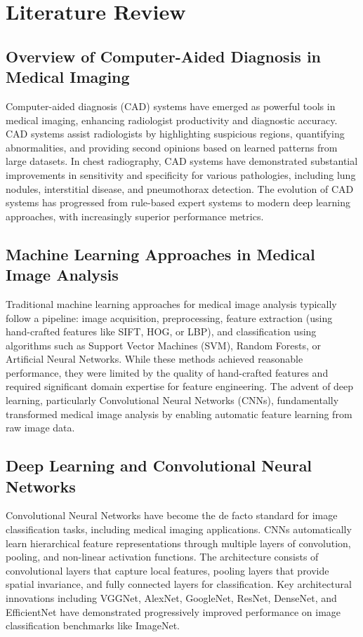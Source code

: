 \chapter{Literature Review}\thispagestyle{empty}
\graphicspath{{Chapter2/figures/}}
{

\section{Overview of Computer-Aided Diagnosis in Medical Imaging}

Computer-aided diagnosis (CAD) systems have emerged as powerful tools in medical imaging, enhancing radiologist productivity and diagnostic accuracy. CAD systems assist radiologists by highlighting suspicious regions, quantifying abnormalities, and providing second opinions based on learned patterns from large datasets. In chest radiography, CAD systems have demonstrated substantial improvements in sensitivity and specificity for various pathologies, including lung nodules, interstitial disease, and pneumothorax detection. The evolution of CAD systems has progressed from rule-based expert systems to modern deep learning approaches, with increasingly superior performance metrics.

\section{Machine Learning Approaches in Medical Image Analysis}

Traditional machine learning approaches for medical image analysis typically follow a pipeline: image acquisition, preprocessing, feature extraction (using hand-crafted features like SIFT, HOG, or LBP), and classification using algorithms such as Support Vector Machines (SVM), Random Forests, or Artificial Neural Networks. While these methods achieved reasonable performance, they were limited by the quality of hand-crafted features and required significant domain expertise for feature engineering. The advent of deep learning, particularly Convolutional Neural Networks (CNNs), fundamentally transformed medical image analysis by enabling automatic feature learning from raw image data.

\section{Deep Learning and Convolutional Neural Networks}

Convolutional Neural Networks have become the de facto standard for image classification tasks, including medical imaging applications. CNNs automatically learn hierarchical feature representations through multiple layers of convolution, pooling, and non-linear activation functions. The architecture consists of convolutional layers that capture local features, pooling layers that provide spatial invariance, and fully connected layers for classification. Key architectural innovations including VGGNet, AlexNet, GoogleNet, ResNet, DenseNet, and EfficientNet have demonstrated progressively improved performance on image classification benchmarks like ImageNet.

}
